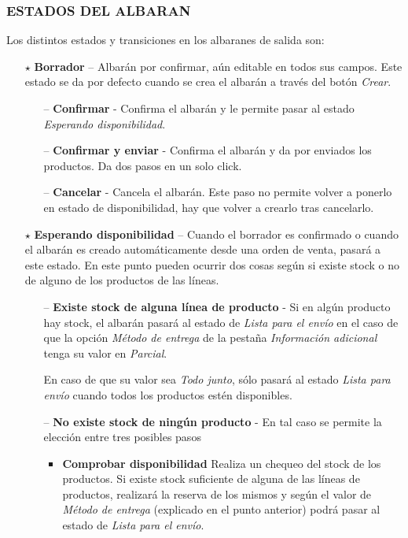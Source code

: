 \vspace{0.5cm}
\subsubsection{ESTADOS DEL ALBARAN}

Los distintos estados y transiciones en los albaranes de salida son:

\begin{itemize}

  \item[$\star$] \textbf{Borrador} -- Albarán por confirmar, aún editable en todos sus campos. Este estado se da por defecto cuando se crea el albarán a través del botón \emph{Crear}.

    \begin{itemize}
      \item[--] \textbf{Confirmar} - Confirma el albarán y le permite pasar al estado \emph{Esperando disponibilidad}.
      \item[--] \textbf{Confirmar y enviar} - Confirma el albarán y da por enviados los productos. Da dos pasos en un solo click.
      \item[--] \textbf{Cancelar} - Cancela el albarán. Este paso no permite volver a ponerlo en estado de disponibilidad, hay que volver a crearlo tras cancelarlo.
    \end{itemize}



  \item[$\star$] \textbf{Esperando disponibilidad} -- Cuando el borrador es confirmado o cuando el albarán es creado automáticamente desde una orden de venta, pasará a este estado. En este punto pueden ocurrir dos cosas según si existe stock o no de alguno de los productos de las líneas.

    \begin{itemize}
    \item[--] \textbf{Existe stock de alguna línea de producto} - Si en algún producto hay stock, el albarán pasará al estado de \emph{Lista para el envío} en el caso de que la opción \emph{Método de entrega} de la pestaña \emph{Información adicional} tenga su valor en \emph{Parcial}. 

En caso de que su valor sea \emph{Todo junto}, sólo pasará al estado \emph{Lista para envío} cuando todos los productos estén disponibles.
      
    \item[--] \textbf{No existe stock de ningún producto} - En tal caso se permite la elección entre tres posibles pasos
      \begin{itemize}
      \item \textbf{Comprobar disponibilidad} Realiza un chequeo del stock de los productos. Si existe stock suficiente de alguna de las líneas de productos, realizará la reserva de los mismos y según el valor de \emph{Método de entrega} (explicado en el punto anterior) podrá pasar al estado de \emph{Lista para el envío}.


\end{itemize}
\end{itemize}
\end{itemize}
